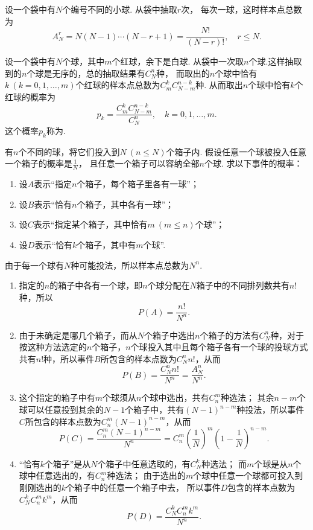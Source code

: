 \begin{example}
设一个袋中有\(N\)个编号不同的小球.
从袋中抽取\(r\)次，
每次一球，这时样本点总数为\[
A_N^r = N(N-1)\dotsb(N-r+1) = \frac{N!}{(N-r)!},
\quad
r \leq N.
\]
\end{example}

\begin{example}
设一个袋中有\(N\)个球，其中\(m\)个红球，余下是白球.
从袋中一次取\(n\)个球.这样抽取到的\(n\)个球是无序的，总的抽取结果有\(C_N^n\)种，
而取出的\(n\)个球中恰有\(k\ (k=0,1,\dotsc,m)\)个红球的样本点总数为\(C_m^k C_{N-m}^{n-k}\)种.
从而取出\(n\)个球中恰有\(k\)个红球的概率为\[
p_k = \frac{C_m^k C_{N-m}^{n-k}}{C_N^n},
\quad k=0,1,\dotsc,m.
\]
这个概率\(p_k\)称为.
\end{example}

\begin{example}[投球问题]\label{example:概率论基础.古典概型.投球问题}
有\(n\)个不同的球，将它们投入到\(N\ (n \leq N)\)个箱子内.
假设任意一个球被投入任意一个箱子的概率是\(\frac{1}{N}\)，
且任意一个箱子可以容纳全部\(n\)个球.
求以下事件的概率：
\begin{enumerate}
\item 设\(A\)表示“指定\(n\)个箱子，每个箱子里各有一球”；
\item 设\(B\)表示“恰有\(n\)个箱子，其中各有一球”；
\item 设\(C\)表示“指定某个箱子，其中恰有\(m\ (m \leq n)\)个球”；
\item 设\(D\)表示“恰有\(k\)个箱子，其中有\(m\)个球”.
\end{enumerate}
\begin{solution}
由于每一个球有\(N\)种可能投法，所以样本点总数为\(N^n\).
\begin{enumerate}
\item
指定的\(n\)的箱子中各有一个球，即\(n\)个球分配在\(N\)箱子中的不同排列数共有\(n!\)种，所以\[
P(A) = \frac{n!}{N^n}.
\]

\item
由于未确定是哪几个箱子，而从\(N\)个箱子中选出\(n\)个箱子的方法有\(C_N^n\)种，对于按这种方法选定的\(n\)个箱子，\(n\)个球投入其中且每个箱子各有一个球的投球方式共有\(n!\)种，所以事件\(B\)所包含的样本点数为\(C_N^n n!\)，从而\[
P(B) = \frac{C_N^n n!}{N^n} = \frac{A_N^n}{N^n}.
\]

\item
这个指定的箱子中有\(m\)个球须从\(n\)个球中选出，共有\(C_n^m\)种选法；
其余\(n-m\)个球可以任意投到其余的\(N-1\)个箱子中，共有\((N-1)^{n-m}\)种投法，所以事件\(C\)所包含的样本点数为\(C_n^m (N-1)^{n-m}\)，从而\[
P(C) = \frac{C_n^m (N-1)^{n-m}}{N^n}
= C_n^m \left(\frac{1}{N}\right)^m \left(1-\frac{1}{N}\right)^{n-m}.
\]

\item
“恰有\(k\)个箱子”是从\(N\)个箱子中任意选取的，有\(C_N^k\)种选法；
而\(m\)个球是从\(n\)个球中任意选出的，有\(C_n^m\)种选法；
由于选出的\(m\)个球中任意一个球都可投入到刚刚选出的\(k\)个箱子中的任意一个箱子中去，
所以事件\(D\)包含的样本点数为\(C_N^k C_n^m k^m\)，从而\[
P(D) = \frac{C_N^k C_n^m k^m}{N^n}.
\]
\end{enumerate}
\end{solution}
\end{example}

